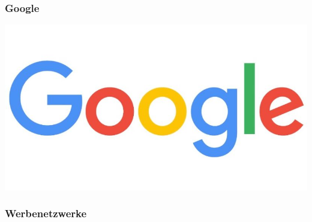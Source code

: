 \documentclass[12pt]{beamer}
\begin{document}
\begin{frame}
  \frametitle{Google}
  \begin{center}
    \includegraphics[height=0.4\textheight]{img/google.jpg}
  \end{center}
\end{frame}

\begin{frame}
  \frametitle{Werbenetzwerke}
  \begin{center}
  \end{center}
\end{frame}
\end{document}
